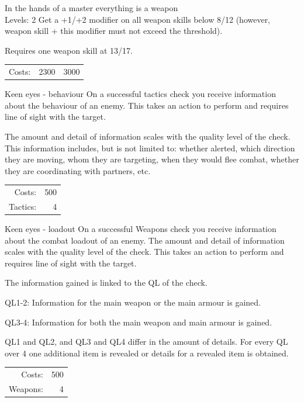 \begin{skill}{In the hands of a master everything is a weapon \\\phantom{a}\hfill Levels: 2}
	\setlength{\parskip}{8pt}
	\setlength{\parindent}{0pt}
	Get a +1/+2 modifier on all weapon skills below 8/12 (however, weapon skill + this modifier must not exceed the threshold). 

	Requires one weapon skill at 13/17.\\

	\hfill
	\begin{tabular}{rrr}
		Costs: & 2300 & 3000 \\
	\end{tabular}
\end{skill}

\begin{skill}{Keen eyes - behaviour}
	\setlength{\parskip}{8pt}
	\setlength{\parindent}{0pt}
	On a successful tactics check you receive information about the behaviour of an enemy. This takes an action to perform and requires line of sight with the target.

	The amount and detail of information scales with the quality level of the check. This information includes, but is not limited to: whether alerted, which direction they are moving, whom they are targeting, when they would flee combat, whether they are coordinating with partners, etc.\\

	\hfill
	\begin{tabular}{rr}
		Costs: & 500 \\
		Tactics: & 4 \\
	\end{tabular}
\end{skill}

\begin{skill}{Keen eyes - loadout}
	\setlength{\parskip}{8pt}
	\setlength{\parindent}{0pt}
	On a successful Weapons check you receive information about the combat loadout of an enemy. The amount and detail of information scales with the quality level of the check. This takes an action to perform and requires line of sight with the target.

	The information gained is linked to the QL of the check.

	  QL1-2: Information for the main weapon or the main armour is gained.

	  QL3-4: Information for both the main weapon and main armour is gained.

	QL1 and QL2, and QL3 and QL4 differ in the amount of details. For every QL over 4 one additional item is revealed or details for a revealed item is obtained.\\

	\hfill
	\begin{tabular}{rr}
		Costs: & 500 \\
		Weapons: & 4 \\
	\end{tabular}
\end{skill}

